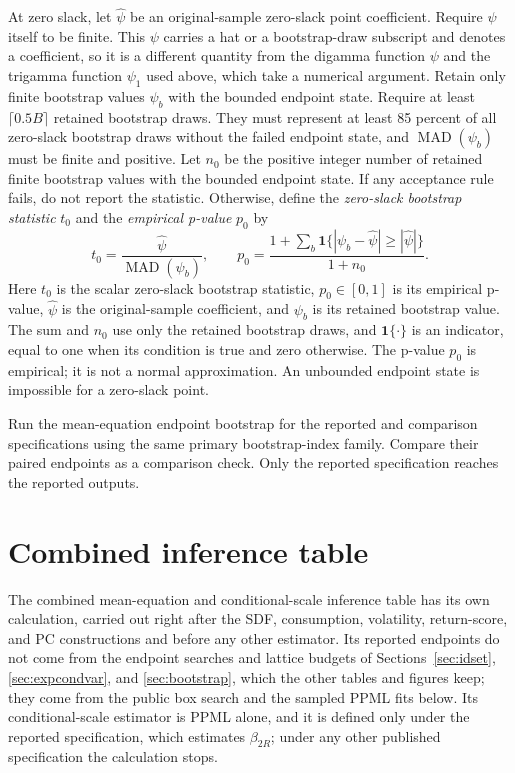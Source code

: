 \documentclass[11pt]{article}
\begin{document}
At zero slack, let \(\widehat\psi\) be an original-sample zero-slack point coefficient. Require
\(\widehat\psi\) itself to be finite. This \(\psi\) carries a hat or a bootstrap-draw subscript and
denotes a coefficient, so it is a different quantity from the digamma function \(\psi\) and the
trigamma function \(\psi_1\) used above, which take a numerical argument. Retain only
finite bootstrap values \(\psi_b\) with the bounded endpoint state. Require at least
\(\lceil0.5B\rceil\) retained bootstrap draws. They must represent at least 85 percent of all zero-slack bootstrap draws
without the failed endpoint state, and \(\operatorname{MAD}(\psi_b)\) must be finite and positive.
Let \(n_0\) be the positive integer number of retained finite bootstrap values with the bounded
endpoint state.
If any acceptance rule fails, do not report the statistic. Otherwise, define the
\emph{zero-slack bootstrap statistic} \(t_0\) and the
\emph{empirical p-value} \(p_0\) by
\begin{equation}
 t_0=\frac{\widehat\psi}{\operatorname{MAD}(\psi_b)},
 \qquad
 p_0=\frac{1+\sum_b
 \mathbf 1\{|\psi_b-\widehat\psi|\ge|\widehat\psi|\}}
 {1+n_0}.
 \label{eq:tau-zero-inference}
\end{equation}
Here \(t_0\) is the scalar zero-slack bootstrap statistic, \(p_0\in[0,1]\) is its empirical
p-value, \(\widehat\psi\) is the original-sample coefficient, and \(\psi_b\) is its retained
bootstrap value. The sum and \(n_0\) use only the retained bootstrap draws, and
\(\mathbf 1\{\cdot\}\) is an indicator,
equal to one when its condition is true and zero otherwise. The p-value \(p_0\) is empirical;
it is not a normal approximation. An unbounded endpoint state is impossible for a zero-slack point.

Run the mean-equation endpoint bootstrap for the reported and comparison specifications using the
same primary bootstrap-index family. Compare their paired endpoints as a comparison check. Only the
reported specification reaches the reported outputs.

\section{Combined inference table}
\label{sec:combined-table}

The combined mean-equation and conditional-scale inference table has its own calculation, carried
out right after the SDF, consumption, volatility, return-score, and PC constructions and before any
other estimator. Its reported endpoints do not come from the endpoint searches and lattice budgets
of Sections~\ref{sec:idset}, \ref{sec:expcondvar}, and \ref{sec:bootstrap}, which the other tables
and figures keep; they come from the public box search and the sampled PPML fits below. Its conditional-scale estimator is PPML
alone, and it is defined only under the reported specification, which estimates \(\beta_{2R}\);
under any other published specification the calculation stops.
\end{document}
